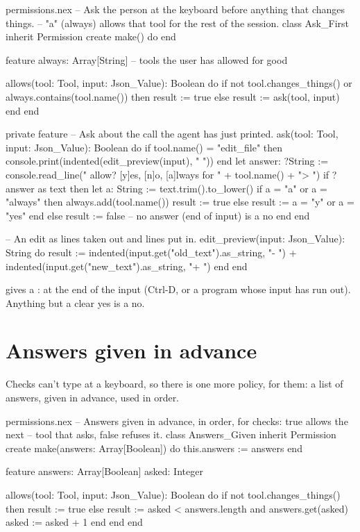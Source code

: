 \begin{append}{permissions.nex}
-- Ask the person at the keyboard before anything that changes things.
-- "a" (always) allows that tool for the rest of the session.
class Ask_First inherit Permission
create
  make() do
  end

feature
  always: Array[String]    -- tools the user has allowed for good

  allows(tool: Tool, input: Json_Value): Boolean do
    if not tool.changes_things() or always.contains(tool.name()) then
      result := true
    else
      result := ask(tool, input)
    end
  end

  private feature
    -- Ask about the call the agent has just printed.
    ask(tool: Tool, input: Json_Value): Boolean do
      if tool.name() = "edit_file" then
        console.print(indented(edit_preview(input), "      "))
      end
      let answer: ?String := console.read_line("    allow? [y]es, [n]o, [a]lways for "
        + tool.name() + "> ")
      if ?answer as text then
        let a: String := text.trim().to_lower()
        if a = "a" or a = "always" then
          always.add(tool.name())
          result := true
        else
          result := a = "y" or a = "yes"
        end
      else
        result := false     -- no answer (end of input) is a no
      end
    end

    -- An edit as lines taken out and lines put in.
    edit_preview(input: Json_Value): String do
      result := indented(input.get("old_text").as_string, "- ")
        + indented(input.get("new_text").as_string, "+ ")
    end
end
\end{append}

 gives a :  at the end of
the input (Ctrl-D, or a program whose input has run out). Anything but a
clear yes is a no.

\section{Answers given in advance}

Checks can't type at a keyboard, so there is one more policy, for them: a
list of answers, given in advance, used in order.

\begin{append}{permissions.nex}
-- Answers given in advance, in order, for checks: true allows the next
-- tool that asks, false refuses it.
class Answers_Given inherit Permission
create
  make(answers: Array[Boolean]) do
    this.answers := answers
  end

feature
  answers: Array[Boolean]
  asked: Integer

  allows(tool: Tool, input: Json_Value): Boolean do
    if not tool.changes_things() then
      result := true
    else
      result := asked < answers.length and answers.get(asked)
      asked := asked + 1
    end
  end
end
\end{append}

